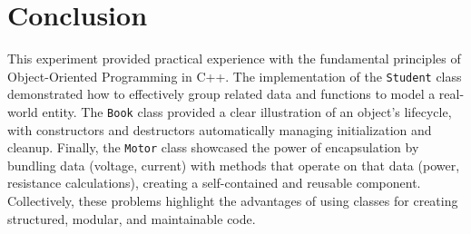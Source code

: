 \section{Conclusion}

This experiment provided practical experience with the fundamental principles of Object-Oriented Programming in C++. The implementation of the \texttt{Student} class demonstrated how to effectively group related data and functions to model a real-world entity. The \texttt{Book} class provided a clear illustration of an object's lifecycle, with constructors and destructors automatically managing initialization and cleanup. Finally, the \texttt{Motor} class showcased the power of encapsulation by bundling data (voltage, current) with methods that operate on that data (power, resistance calculations), creating a self-contained and reusable component. Collectively, these problems highlight the advantages of using classes for creating structured, modular, and maintainable code.
